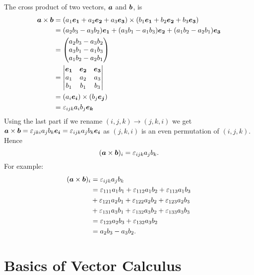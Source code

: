 The cross product of two vectors, \(\bm{a}\) and \(\bm{b}\), is
\begin{align*}
    \bm{a}\times\bm{b} &= (a_1\bm{e_{1}} + a_2\bm{e_{2}} + a_3\bm{e_{3}})\times(b_1\bm{e_{1}} + b_2\bm{e_{2}} + b_3\bm{e_{3}})\\
    &= (a_2b_3 - a_3b_2)\bm{e_{1}} + (a_3b_1 - a_1b_3)\bm{e_{2}} + (a_1b_2 - a_2b_1)\bm{e_{3}}\\
    &= 
    \begin{pmatrix}
        a_2b_3 - a_3b_2\\
        a_3b_1 - a_1b_3\\
        a_1b_2 - a_2b_1
    \end{pmatrix}
    \\
    &=
    \begin{vmatrix}
        \bm{e_{1}} & \bm{e_{2}} & \bm{e_{3}}\\
        a_1 & a_2 & a_3\\
        b_1 & b_1 & b_3
    \end{vmatrix}
    \\
    &= (a_i\bm{e_{i}})\times(b_j\bm{e_{j}})\\
    &= \varepsilon_{ijk}a_ib_j\bm{e_{k}}
\end{align*}
Using the last part if we rename \((i, j, k)\rightarrow (j, k, i)\) we get \(\bm{a}\times\bm{b} = \varepsilon_{jki}a_jb_k\bm{e_{i}} = \varepsilon_{ijk}a_jb_k\bm{e_{i}}\) as \((j, k, i)\) is an even permutation of \((i, j, k)\).
Hence
\[(\bm{a}\times\bm{b})_i = \varepsilon_{ijk}a_jb_k.\]
For example:
\begin{align*}
    (\bm{a}\times\bm{b})_i &= \varepsilon_{ijk}a_jb_k\\
    &= \varepsilon_{111}a_1b_1 + \varepsilon_{112}a_1b_2 + \varepsilon_{113}a_1b_3\\
    &+ \varepsilon_{121}a_2b_1 + \varepsilon_{122}a_2b_2 + \varepsilon_{123}a_2b_3\\
    &+ \varepsilon_{131}a_3b_1 + \varepsilon_{132}a_3b_2 + \varepsilon_{133}a_3b_3\\
    &= \varepsilon_{123}a_2b_3 + \varepsilon_{132}a_3b_2\\
    &= a_2b_3  - a_3b_2.
\end{align*}

\section{Basics of Vector Calculus}
